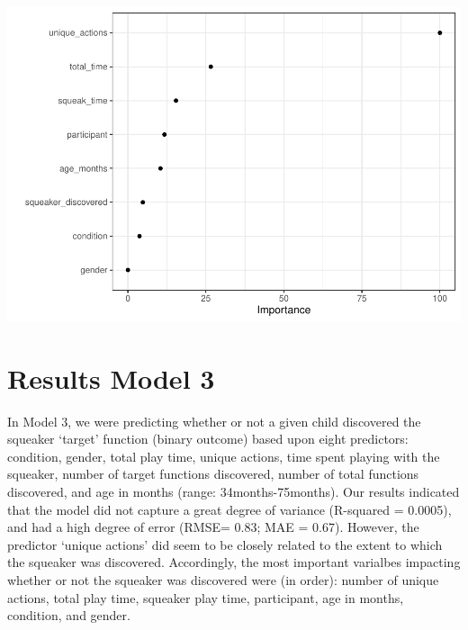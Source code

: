 \documentclass[
  english,
  man]{apa6}
\newenvironment{Shaded}{\begin{snugshade}}{\end{snugshade}}
\newcommand{\AttributeTok}[1]{\textcolor[rgb]{0.77,0.63,0.00}{#1}}
\newcommand{\CommentTok}[1]{\textcolor[rgb]{0.56,0.35,0.01}{\textit{#1}}}
\newcommand{\FunctionTok}[1]{\textcolor[rgb]{0.00,0.00,0.00}{#1}}
\newcommand{\NormalTok}[1]{#1}
\newcommand{\OtherTok}[1]{\textcolor[rgb]{0.56,0.35,0.01}{#1}}
\newcommand{\SpecialCharTok}[1]{\textcolor[rgb]{0.00,0.00,0.00}{#1}}
\begin{document}
\includegraphics{capstone640_files/figure-latex/unnamed-chunk-5-2.pdf}

\begin{Shaded}
\end{Shaded}

\hypertarget{results-model-3}{%
\section{Results Model 3}\label{results-model-3}}

In Model 3, we were predicting whether or not a given child discovered the squeaker
`target' function (binary outcome) based upon eight predictors: condition, gender,
total play time, unique actions, time spent playing with the squeaker, number of
target functions discovered, number of total functions discovered, and age in months
(range: 34months-75months). Our results indicated that the model did not capture a
great degree of variance (R-squared = 0.0005), and had a high degree of error (RMSE=
0.83; MAE = 0.67). However, the predictor `unique actions' did seem to be closely
related to the extent to which the squeaker was discovered. Accordingly, the most
important varialbes impacting whether or not the squeaker was discovered were (in
order): number of unique actions, total play time, squeaker play time, participant,
age in months, condition, and gender.
\end{document}

